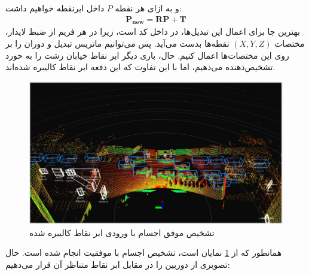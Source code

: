 و به ازای هر نقطه $P$ داخل ابر‌نقطه خواهیم داشت:
\begin{align}
    \mathbf{P_{new}} = \mathbf{R}\mathbf{P} + \mathbf{T}
\end{align}
بهترین جا برای اعمال این تبدیل‌ها، در داخل کد  است، زیرا در هر فریم از ضبط لایدار، مختصات $(X,Y,Z)$ نقطه‌ها بدست می‌آید. پس می‌توانیم ماتریس تبدیل و دوران را بر روی این مختصات‌ها اعمال کنیم. حال، باری دیگر ابر نقاط خیابان رشت را به خورد تشخیص‌دهنده می‌دهیم، اما با این تفاوت که این دفعه ابر نقاط کالیبره شده‌اند.

\begin{figure}[h!]
    \centering
    \includegraphics[width=1\linewidth]{figures/Rasht_Calibrated_3D_Detection.png}
    \caption{تشخیص موفق اجسام با ورودی ابر نقاط کالیبره شده}
    \label{fig:Rasht_Calibrated_3D_Detection}
\end{figure}

همانطور که از \cref{fig:Rasht_Calibrated_3D_Detection} نمایان است، تشخیص اجسام با موفقیت انجام شده است. حال تصویری از دوربین را در مقابل ابر نقاط متناظر آن قرار می‌دهیم:

